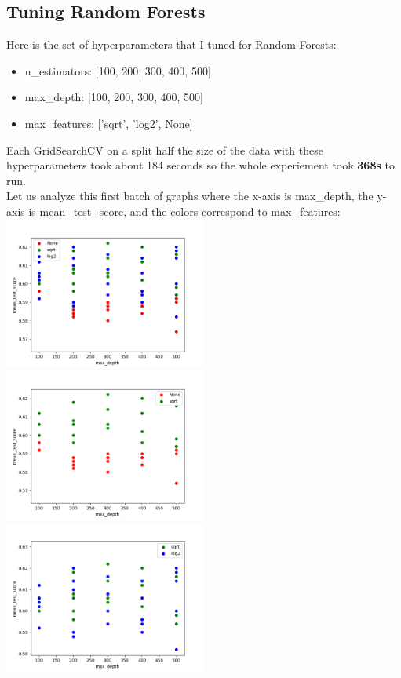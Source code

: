\documentclass[12pt]{article}
\begin{document}
\subsection{Tuning Random Forests}
Here is the set of hyperparameters that I tuned for Random Forests:
\begin{itemize}
    \item n\_estimators: [100, 200, 300, 400, 500]
    \item max\_depth: [100, 200, 300, 400, 500]
    \item max\_features: ['sqrt', 'log2', None]
\end{itemize}
Each GridSearchCV on a split half the size of the data with these hyperparameters took about 184 seconds so the whole experiement took \textbf{368s} to run. \\
Let us analyze this first batch of graphs where the x-axis is max\_depth, the y-axis is mean\_test\_score, and the colors correspond to max\_features: \\
\includegraphics[width=0.5\textwidth]{RF_max_depth0.png}
\includegraphics[width=0.5\textwidth]{RF_max_depth1.png}
\includegraphics[width=0.5\textwidth]{RF_max_depth2.png}
\end{document}
